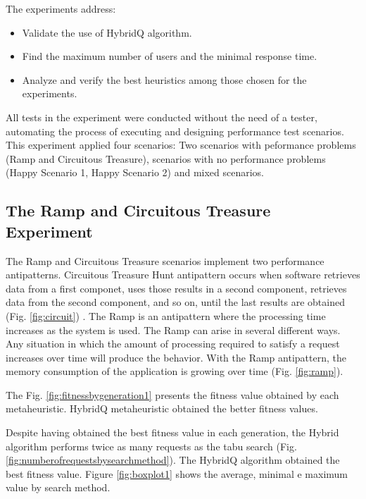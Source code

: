 \documentclass{bmcart}
\begin{document}
The experiments address:

\begin{itemize}
\item Validate the use of HybridQ algorithm.
\item Find the maximum number of users and the minimal response time.
\item Analyze and verify the best heuristics among those chosen for the experiments.
\end{itemize}




All tests in the experiment were conducted without the need of a tester, automating the process of executing and designing performance test scenarios. This experiment applied four scenarios: Two scenarios with peformance problems (Ramp and Circuitous Treasure), scenarios with no performance problems (Happy Scenario 1, Happy Scenario 2) and mixed scenarios. 

\subsection{The Ramp and Circuitous Treasure Experiment}

The Ramp and Circuitous Treasure scenarios implement two performance antipatterns.  Circuitous Treasure Hunt antipattern occurs when software retrieves data from a first componet, uses those results in a second component, retrieves data from the second component, and so on, until the last results are obtained (Fig. \ref{fig:circuit})  \citep{Smith2002} \citep{Smith2003}. The Ramp is an antipattern where the processing time increases as the system is used. The Ramp can arise in several different ways. Any situation in which the amount of processing required to satisfy a request increases over time will produce the behavior. With the Ramp antipattern, the memory consumption of the application is growing over time (Fig. \ref{fig:ramp}). 




The Fig. \ref{fig:fitnessbygeneration1}  presents the fitness value obtained by each metaheuristic. HybridQ metaheuristic obtained the better fitness values.  








Despite having obtained the best fitness value in each generation, the Hybrid algorithm performs twice as many requests as the  tabu search (Fig. \ref{fig:numberofrequestsbysearchmethod}). The HybridQ algorithm obtained the best fitness value. Figure \ref{fig:boxplot1} shows the average, minimal e maximum value by search method.
\end{document}
